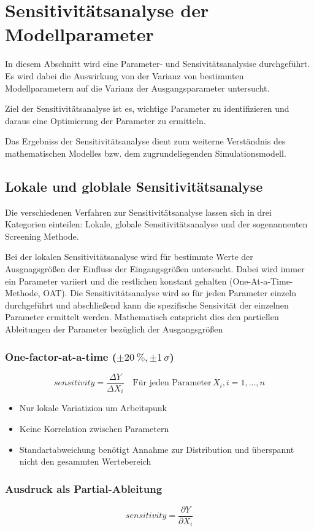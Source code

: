 \pagestyle{milan}
\section{Sensitivitätsanalyse der Modellparameter} \label{sec:sesitivitaetsanalyse}
In diesem Abschnitt wird eine Parameter- und Sensivitätsanalysise durchgeführt. 
Es wird dabei die Auswirkung von der Varianz von bestimmten Modellparametern auf die Varianz der Ausgangsparameter untersucht.

Ziel der Sensitivitätsanalyse ist es, wichtige Parameter zu identifizieren und daraus eine Optimierung der Parameter zu ermitteln.

Das Ergebniss der Sensitivitätsanalyse dient zum weiterne Verständnis des mathematischen Modelles bzw. dem zugrundeliegenden Simulationsmodell.
\subsection{Lokale und globlale Sensitivitätsanalyse}

Die verschiedenen Verfahren zur Sensitivitätsanalyse lassen sich in drei Kategorien einteilen: Lokale, globale Sensitivitätsanalyse und der sogenannenten Screening Methode.

Bei der lokalen Sensitivitätsanalyse wird für bestimmte Werte der Ausgnagsgrößen der Einfluss der Eingangsgrößen untersucht. Dabei wird immer ein Parameter variiert und die restlichen konstant gehalten (One-At-a-Time-Methode, OAT).
Die Sensitivitätsanalyse wird so für jeden Parameter einzeln durchgeführt und abschließend kann die spezifische Sensivität der einzelnen Parameter ermittelt werden.
Mathematisch entspricht dies den partiellen Ableitungen der Parameter bezüglich der Ausgangsgrößen

\subsubsection*{One-factor-at-a-time ($\pm \SI{20}{\percent}, \pm 1\, \sigma$)}

\begin{equation}
    sensitivity=\frac{\Delta Y}{\Delta X_{i}} \quad \textrm{Für jeden Parameter}\,X_i, i=1,\dots,n
\end{equation}
\begin{itemize}
    \item Nur lokale Variatizion um Arbeitspunk 
    \item Keine Korrelation zwischen Parametern
    \item Standartabweichung benötigt Annahme zur Distribution und überspannt nicht den gesammten Wertebereich
\end{itemize}

\subsubsection*{Ausdruck als Partial-Ableitung}
\begin{equation}
    sensitivity=\frac{\partial Y}{\partial X_i}
\end{equation}